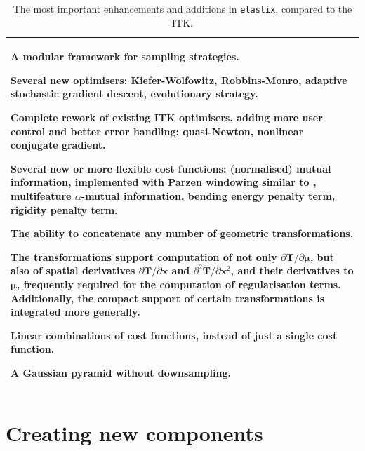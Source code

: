 \documentclass[]{report}
\newcommand{\elastix}{\texttt{elastix}}
\newcommand{\vx}{\bm{x}}
\newcommand{\vmu}{\bm{\mu}}
\newcommand{\vT}{\bm{T}}
\begin{document}
\begin{table}
\centering
\begin{tabular}{p{30pc}}
\toprule \toprule
\begin{list}{}{\leftmargin=1em}
\item A modular framework for sampling strategies.

\item Several new optimisers: Kiefer-Wolfowitz, Robbins-Monro,
adaptive stochastic gradient descent, evolutionary strategy.

\item Complete rework of existing ITK optimisers, adding more user
control and better error handling: quasi-Newton, nonlinear conjugate
gradient.

\item Several new or more flexible cost functions: (normalised) mutual
information, implemented with Parzen windowing similar to
\cite{ThevenazEA00a}, multifeature $\alpha$-mutual information,
bending energy penalty term, rigidity penalty term.

\item The ability to concatenate any number of geometric
transformations.

\item The transformations support computation of not only
$\partial \vT / \partial \vmu$, but also of spatial derivatives
$\partial \vT / \partial \vx$ and $\partial^2 \vT / \partial \vx^2$,
and their derivatives to $\vmu$, frequently required for the
computation of regularisation terms. Additionally, the compact
support of certain transformations is integrated more generally.

\item Linear combinations of cost functions, instead of just a single cost
function.

\item A Gaussian pyramid without downsampling.
\end{list}\\
 \bottomrule \bottomrule
\end{tabular}
\caption{The most important enhancements and additions in \elastix,
compared to the ITK.}\label{table:extras}
\end{table}



\section{Creating new components}
\end{document}
